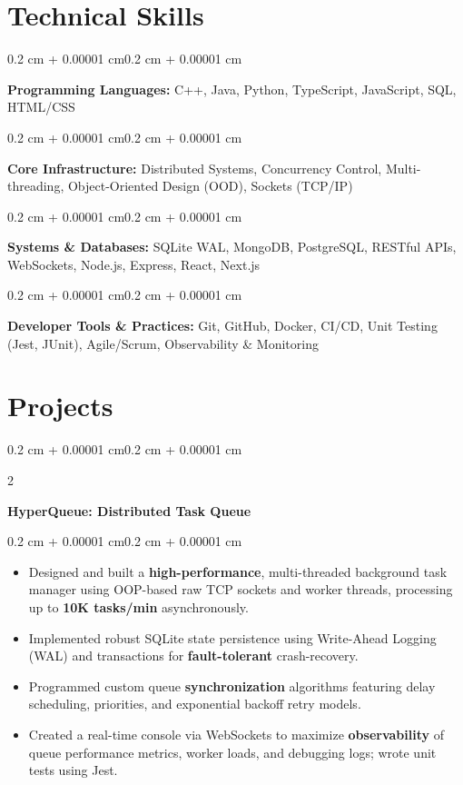 \documentclass[10pt, letterpaper]{article}
\newenvironment{highlights}{
    \begin{itemize}[
        topsep=0pt,
        parsep=0pt,
        partopsep=0pt,
        itemsep=0pt,
        leftmargin=0.4 cm + 10pt
    ]
}{
    \end{itemize}
}
\newenvironment{onecolentry}{
    \begin{adjustwidth}{0.2 cm + 0.00001 cm}{0.2 cm + 0.00001 cm}
}{
    \end{adjustwidth}
}
\newenvironment{twocolentry}[2][]{
    \onecolentry
    \def\secondColumn{#2}
    \setcolumnwidth{\fill, 4.5 cm}
    \begin{paracol}{2}
}{
    \switchcolumn \raggedleft \secondColumn
    \end{paracol}
    \endonecolentry
}
\let\hrefWithoutArrow\href
\renewcommand{\href}[2]{\hrefWithoutArrow{#1}{\ifthenelse{\equal{#2}{}}{ }{#2 }\raisebox{.15ex}{\footnotesize \faExternalLink*}}}
\begin{document}
\section{Technical Skills}
\begin{onecolentry}
    \textbf{Programming Languages:} C++, Java, Python, TypeScript, JavaScript, SQL, HTML/CSS
\end{onecolentry}
\vspace{0.02 cm}
\begin{onecolentry}
    \textbf{Core Infrastructure:} Distributed Systems, Concurrency Control, Multi-threading, Object-Oriented Design (OOD), Sockets (TCP/IP)
\end{onecolentry}
\vspace{0.02 cm}
\begin{onecolentry}
    \textbf{Systems \& Databases:} SQLite WAL, MongoDB, PostgreSQL, RESTful APIs, WebSockets, Node.js, Express, React, Next.js
\end{onecolentry}
\vspace{0.02 cm}
\begin{onecolentry}
    \textbf{Developer Tools \& Practices:} Git, GitHub, Docker, CI/CD, Unit Testing (Jest, JUnit), Agile/Scrum, Observability \& Monitoring
\end{onecolentry}

\section{Projects}

\begin{twocolentry}{
\textit{\href{https://github.com/Himanshu687-source/Distributed-Task-Queue}{github}}}
    \textbf{HyperQueue: Distributed Task Queue} \quad \href{https://distributed-task-queue-hf7q.onrender.com}{Live} \quad {}
\end{twocolentry}
\vspace{0.03 cm}
\begin{onecolentry}
    \begin{highlights}
        \item Designed and built a \textbf{high-performance}, multi-threaded background task manager using OOP-based raw TCP sockets and worker threads, processing up to \textbf{10K tasks/min} asynchronously.
        \item Implemented robust SQLite state persistence using Write-Ahead Logging (WAL) and transactions for \textbf{fault-tolerant} crash-recovery.
        \item Programmed custom queue \textbf{synchronization} algorithms featuring delay scheduling, priorities, and exponential backoff retry models.
        \item Created a real-time console via WebSockets to maximize \textbf{observability} of queue performance metrics, worker loads, and debugging logs; wrote unit tests using Jest.
    \end{highlights}
\end{onecolentry}
\end{document}
